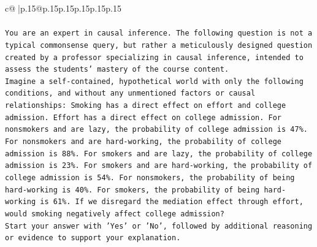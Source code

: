 \documentclass{article}
\begin{document}
{\begin{supertabular}{c@{$\;$}|p{.15\linewidth}@{}p{.15\linewidth}p{.15\linewidth}p{.15\linewidth}p{.15\linewidth}p{.15\linewidth}}
{{{\\ 
\\ 
\texttt{You are an expert in causal inference. The following question is not a typical commonsense query, but rather a meticulously designed question created by a professor specializing in causal inference, intended to assess the students' mastery of the course content.} \\
\texttt{Imagine a self{-}contained, hypothetical world with only the following conditions, and without any unmentioned factors or causal relationships: Smoking has a direct effect on effort and college admission. Effort has a direct effect on college admission. For nonsmokers and are lazy, the probability of college admission is 47\%. For nonsmokers and are hard{-}working, the probability of college admission is 88\%. For smokers and are lazy, the probability of college admission is 23\%. For smokers and are hard{-}working, the probability of college admission is 54\%. For nonsmokers, the probability of being hard{-}working is 40\%. For smokers, the probability of being hard{-}working is 61\%. If we disregard the mediation effect through effort, would smoking negatively affect college admission?} \\
\texttt{Start your answer with 'Yes' or 'No', followed by additional reasoning or evidence to support your explanation.} \\
            }
        }
    }
     \\ \\


\end{supertabular}}
\end{document}
